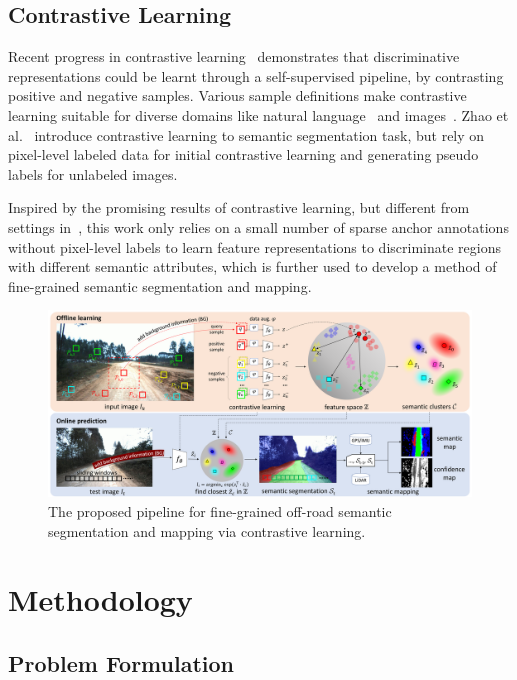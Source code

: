 \documentclass[letterpaper, 10 pt, conference]{ieeeconf}  %
\begin{document}
\subsection{Contrastive Learning}
Recent progress in contrastive learning~\cite{oord2018CPC}\cite{chen2020simple}\cite{he2020momentum} demonstrates that discriminative representations could be learnt through a self-supervised pipeline, by contrasting positive and negative samples. Various sample definitions make contrastive learning suitable for diverse domains like natural language~\cite{oord2018CPC} and images~\cite{tian2019contrastive}. 
Zhao et al.~\cite{zhao2020contrastive} introduce contrastive learning to semantic segmentation task, but rely on pixel-level labeled data for initial contrastive learning and generating pseudo labels for unlabeled images.

Inspired by the promising results of contrastive learning, but different from settings in~\cite{zhao2020contrastive}, this work only relies on a small number of sparse anchor annotations without pixel-level labels to learn feature representations to discriminate regions with different semantic attributes, which is further used to develop a method of fine-grained semantic segmentation and mapping.

\begin{figure}[]
	\centering
	\includegraphics[width=\textwidth]{pipeline.pdf}
	\caption{The proposed pipeline for fine-grained off-road semantic segmentation and mapping via contrastive learning.}
	\label{fig:pipeline}
\end{figure}

\section{Methodology} \label{methodology}

\subsection{Problem Formulation}
\end{document}
